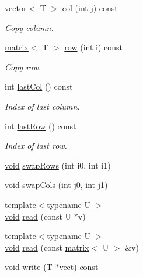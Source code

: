\begin{DoxyCompactItemize}
\hyperlink{classlibNumerics_1_1vector}{vector}$<$ T $>$ \hyperlink{classlibNumerics_1_1matrix_ab67c4f9413dcaf8a8352f843894e51a2}{col} (int j) const 
\begin{DoxyCompactList}\small\item\em Copy column. \end{DoxyCompactList}\item 
\hyperlink{classlibNumerics_1_1matrix}{matrix}$<$ T $>$ \hyperlink{classlibNumerics_1_1matrix_a21bffd86cceb2f390cdb3143f377ad04}{row} (int i) const 
\begin{DoxyCompactList}\small\item\em Copy row. \end{DoxyCompactList}\item 
int \hyperlink{classlibNumerics_1_1matrix_a99a20157b3bd99b8a4814e831853adb8}{last\+Col} () const 
\begin{DoxyCompactList}\small\item\em Index of last column. \end{DoxyCompactList}\item 
int \hyperlink{classlibNumerics_1_1matrix_a980d6a73aafcbcdebca70dd8ef3cb34b}{last\+Row} () const 
\begin{DoxyCompactList}\small\item\em Index of last row. \end{DoxyCompactList}\item 
\hyperlink{png_8h_aa8c59027f9ab2769342f248709d68d17}{void} \hyperlink{classlibNumerics_1_1matrix_a26170160d342acc7321ac42355c630fa}{swap\+Rows} (int i0, int i1)
\item 
\hyperlink{png_8h_aa8c59027f9ab2769342f248709d68d17}{void} \hyperlink{classlibNumerics_1_1matrix_ab2a597ff7ba97b59afd1fa70184f2b49}{swap\+Cols} (int j0, int j1)
\item 
{\footnotesize template$<$typename U $>$ }\\\hyperlink{png_8h_aa8c59027f9ab2769342f248709d68d17}{void} \hyperlink{classlibNumerics_1_1matrix_a0c4f934f4179272ad79d37cf0a405379}{read} (const U $\ast$v)
\item 
{\footnotesize template$<$typename U $>$ }\\\hyperlink{png_8h_aa8c59027f9ab2769342f248709d68d17}{void} \hyperlink{classlibNumerics_1_1matrix_aa4dc5fe7cd506d20552b865f7c92cfc1}{read} (const \hyperlink{classlibNumerics_1_1matrix}{matrix}$<$ U $>$ \&v)
\item 
\hyperlink{png_8h_aa8c59027f9ab2769342f248709d68d17}{void} \hyperlink{classlibNumerics_1_1matrix_a8ac057f5dbb927f36cb111fd92cc2381}{write} (T $\ast$vect) const 

\end{DoxyCompactItemize}
